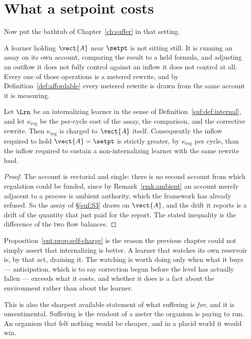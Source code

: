 \section{What a setpoint costs}

Now put the bathtub of Chapter~\ref{ch:suffer} in that setting.

A learner holding $\vect{A}$ near $\setpt$ is not sitting still.
It is running an assay on its own account, comparing the result to a held
formula, and adjusting an outflow it does not fully control against an
inflow it does not control at all.
Every one of those operations is a metered rewrite, and by
Definition~\ref{def:affordable} every metered rewrite is drawn from the
same account it is measuring.

\begin{proposition}
\label{ent:prop:self-charge}
Let $\Lrn$ be an internalizing learner in the sense of
Definition~\ref{suf:def:internal}, and let $\kappa_{\mathrm{reg}}$ be the
per-cycle cost of the assay, the comparison, and the corrective rewrite.
Then $\kappa_{\mathrm{reg}}$ is charged to $\vect{A}$ itself.
Consequently the inflow required to hold $\vect{A} = \setpt$ is strictly
greater, by $\kappa_{\mathrm{reg}}$ per cycle, than the inflow required to
sustain a non-internalizing learner with the same rewrite load.
\end{proposition}

\begin{proof}
The account is vectorial and single: there is no second account from
which regulation could be funded, since by Remark~\ref{rmk:ambient} an
account merely adjacent to a process is ambient authority, which the
framework has already refused.
So the assay of \S\ref{suf:S3} draws on $\vect{A}$, and the drift it
reports is a drift of the quantity that just paid for the report.
The stated inequality is the difference of the two flow balances.
\end{proof}

\begin{remark}
\label{ent:rmk:thermostat}
Proposition~\ref{ent:prop:self-charge} is the reason the previous chapter
could not simply assert that internalizing is better.
A learner that watches its own reservoir is, by that act, draining it.
The watching is worth doing only when what it buys --- anticipation,
which is to say correction begun before the level has actually fallen ---
exceeds what it costs, and whether it does is a fact about the
environment rather than about the learner.

This is also the sharpest available statement of what suffering is
\emph{for}, and it is unsentimental.
Suffering is the readout of a meter the organism is paying to run.
An organism that felt nothing would be cheaper, and in a placid world it
would win.
\end{remark}

